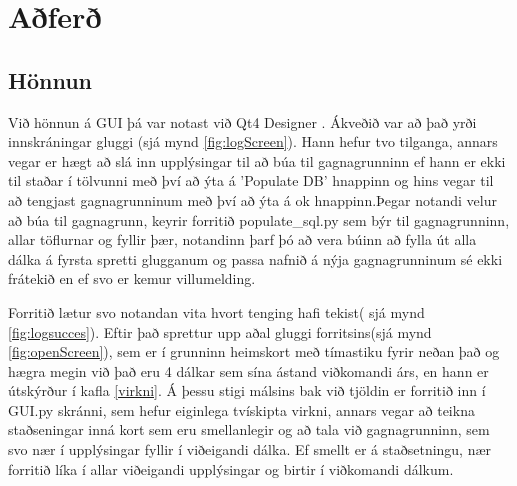 \documentclass[12pt, git, final]{rureport}
\begin{document}
\section{Aðferð}
\subsection{Hönnun}
Við hönnun á GUI þá var notast við Qt4 Designer \cite{qt4}. Ákveðið var að það yrði innskráningar gluggi (sjá mynd \ref{fig:logScreen}). Hann hefur tvo tilganga, annars vegar er hægt að slá inn upplýsingar til að búa til gagnagrunninn ef hann er ekki til staðar í tölvunni með því að ýta á 'Populate DB' hnappinn og hins vegar til að tengjast gagnagrunninum með því að ýta á ok hnappinn.Þegar notandi velur að búa til gagnagrunn, keyrir forritið populate\_sql.py sem býr til gagnagrunninn, allar töflurnar og fyllir þær, notandinn þarf þó að vera búinn að fylla út alla dálka á fyrsta spretti glugganum og passa nafnið á nýja gagnagrunninum sé ekki frátekið en ef svo er kemur villumelding.

Forritið lætur svo notandan vita hvort tenging hafi tekist( sjá mynd \ref{fig:logsucces}). Eftir það sprettur upp aðal gluggi forritsins(sjá mynd \ref{fig:openScreen}), sem er í grunninn heimskort með tímastiku fyrir neðan það og hægra megin við það eru 4 dálkar sem sína ástand viðkomandi árs, en hann er útskýrður  í kafla \ref{virkni}. Á þessu stigi málsins bak við tjöldin er forritið inn í GUI.py skránni, sem hefur eiginlega tvískipta virkni, annars vegar að teikna staðseningar inná kort sem eru smellanlegir og að tala við gagnagrunninn, sem svo nær í upplýsingar fyllir í viðeigandi dálka. Ef smellt er á staðsetningu, nær forritið líka í allar viðeigandi upplýsingar og birtir í viðkomandi dálkum.
 


\end{document}
